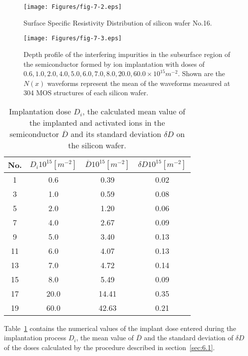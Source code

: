 \begin{figure}[h!]\centering
  \texttt{[image: Figures/fig-7-2.eps]}
  \caption[Area distribution of surface specific resistance of silicon
    wafer No.16]{Surface Specific Resistivity Distribution of silicon
    wafer No.16.}\label{fig:7.2}
\end{figure}

\newpage
\begin{figure}[h!]\centering
  \texttt{[image: Figures/fig-7-3.eps]}
  \caption[Depth profile of tangents]{Depth profile of the interfering
    impurities in the subsurface region of the semiconductor formed by
    ion implantation with doses of $0.6, 1.0, 2.0, 4.0, 5.0, 6.0, 7.0,
    8.0, 20.0, 60.0 \times 10^{15} m^{-2}$. Shown are the $N(x)$
    waveforms represent the mean of the waveforms measured at 304 MOS
    structures of each silicon wafer.}\label{fig:7.3}
\end{figure}

\begin{table}[h!]\centering
  \begin{tabular}{c c c c}
    No. & ${D_{i}}{10}^{15}[m^{-2}]$ & $\overline{D}{10}^{15}[m^{-2}]$ & $\delta{D}{10}^{15}[m^{-2}]$\\
    \hline
    1 & 0.6 & 0.39 & 0.02\\
    3 & 1.0 & 0.59 & 0.08\\
    5 & 2.0 & 1.20 & 0.06\\
    7 & 4.0 & 2.67 & 0.09\\
    9 & 5.0 & 3.40 & 0.13\\
    11 & 6.0 & 4.07 & 0.13\\
    13 & 7.0 & 4.72 & 0.14\\
    15 & 8.0 & 5.49 & 0.09\\
    17 & 20.0 & 14.41 & 0.35\\
    19 & 60.0 & 42.63 & 0.21\\
  \end{tabular}
  \caption[Implantation dose $D_{i}$]{Implantation dose $D_{i}$, the
    calculated mean value of the implanted and activated ions in the
    semiconductor $\overline D$ and its standard deviation $\delta D$
    on the silicon wafer.}\label{tab:7.2}
\end{table}

Table~\ref{tab:7.2} contains the numerical values of the implant dose
entered during the implantation process $D_{i}$, the mean value of
$\overline D$ and the standard deviation of $\delta D$ of the doses
calculated by the procedure described in section~\ref{sec:6.1}.

